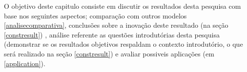 O objetivo deste capitulo consiste em discutir os resultados desta pesquisa com base nos seguintes aspectos; comparação com outros modelos 
\ref{analisecomparativa}, conclusões sobre a inovação deste resultado (na seção \ref{constresult}) , análise referente as questões introdutórias 
desta pesquisa (demonstrar se os resultados objetivos respaldam o contexto introdutório, o que será realizado na seção \ref{constresult}) e 
avaliar possiveis aplicações (em \ref{application}). 


